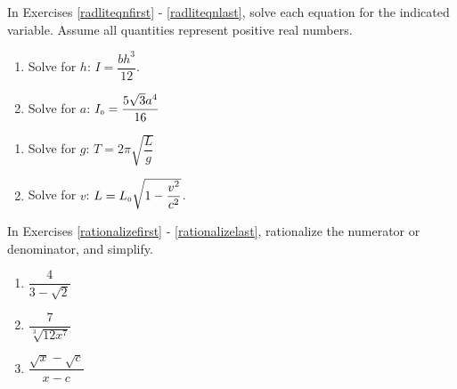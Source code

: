 \documentclass[11pt]{article}
\theoremstyle{definition}  %
\newcounter{HW}
\begin{document}
In Exercises \ref{radliteqnfirst} - \ref{radliteqnlast}, solve each equation for the indicated variable.  Assume all quantities represent positive real numbers.

\begin{multicols}{2}
\begin{enumerate}
\setcounter{enumi}{\value{HW}}


\item Solve for $h$:  $I = \dfrac{bh^3}{12}$.  \label{radliteqnfirst}

\item Solve for $a$:  $I_{\text{\tiny $0$}} = \dfrac{5\sqrt{3} a^4}{16}$

\setcounter{HW}{\value{enumi}}
\end{enumerate}
\end{multicols}


\begin{multicols}{2}
\begin{enumerate}
\setcounter{enumi}{\value{HW}}


\item Solve for $g$:  $T = 2\pi \sqrt{\dfrac{L}{g}}$

\item Solve for $v$:   $L = L_{\text{\tiny $0$}} \sqrt{1 - \dfrac{v^2}{c^2}}$.  \label{radliteqnlast}

\setcounter{HW}{\value{enumi}}
\end{enumerate}
\end{multicols}

In Exercises \ref{rationalizefirst} - \ref{rationalizelast}, rationalize the numerator or denominator, and simplify.


\begin{multicols}{3}
\begin{enumerate}
\setcounter{enumi}{\value{HW}}


\item   $\dfrac{4}{3 - \sqrt{2}}$  \label{rationalizefirst}

\item  $\dfrac{7}{\sqrt[3]{12x^7}}$

\item   $\dfrac{\sqrt{x} - \sqrt{c}}{x - c}$ 

\setcounter{HW}{\value{enumi}}
\end{enumerate}
\end{multicols}
\end{document}
